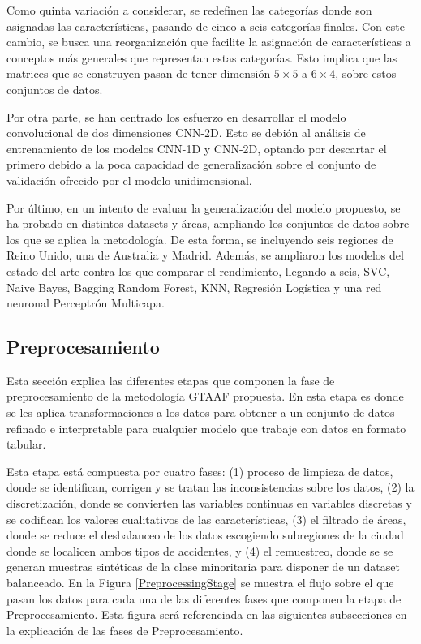 \documentclass{uathesis-es}
\begin{document}


Como quinta variación a considerar, se redefinen las categorías donde son asignadas las características, pasando de cinco a seis categorías finales. Con este cambio, se busca una reorganización que facilite la asignación de características a conceptos más generales que representan estas categorías. Esto implica que las matrices que se construyen pasan de tener dimensión $5\times5$ a $6\times4$, sobre estos conjuntos de datos.

Por otra parte, se han centrado los esfuerzo en desarrollar el modelo convolucional de dos dimensiones CNN-2D. Esto se debión al análisis de entrenamiento de los modelos CNN-1D y CNN-2D, optando por descartar el primero debido a la poca capacidad de generalización sobre el conjunto de validación ofrecido por el modelo unidimensional.

Por último, en un intento de evaluar la generalización del modelo propuesto, se ha probado en distintos datasets y áreas, ampliando los conjuntos de datos sobre los que se aplica la metodología. De esta forma, se incluyendo seis regiones de Reino Unido, una de Australia y Madrid. Además, se ampliaron los modelos del estado del arte contra los que comparar el rendimiento, llegando a seis, SVC, Naive Bayes, Bagging Random Forest, KNN, Regresión Logística y una red neuronal Perceptrón Multicapa.

\subsection{Preprocesamiento}

Esta sección explica las diferentes etapas que componen la fase de preprocesamiento de la metodología GTAAF propuesta. En esta etapa es donde se les aplica transformaciones a los datos para obtener a un conjunto de datos refinado e interpretable para cualquier modelo que trabaje con datos en formato tabular. 

Esta etapa está compuesta por cuatro fases: (1) proceso de limpieza de datos, donde se identifican, corrigen y se tratan las inconsistencias sobre los datos, (2) la discretización, donde se convierten las variables continuas en variables discretas y se codifican los valores cualitativos de las características, (3) el filtrado de áreas, donde se reduce el desbalanceo de los datos escogiendo subregiones de la ciudad donde se localicen ambos tipos de accidentes, y (4) el remuestreo, donde se se generan muestras sintéticas de la clase minoritaria para disponer de un dataset balanceado. En la Figura \ref{PreprocessingStage} se muestra el flujo sobre el que pasan los datos para cada una de las diferentes fases que componen la etapa de Preprocesamiento. Esta figura será referenciada en las siguientes subsecciones en la explicación de las fases de Preprocesamiento.
\end{document}
